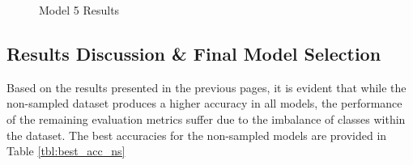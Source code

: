 \documentclass[12pt]{article}
\begin{document}
\begin{figure}[tbp]
\begin{center}
{    \label{fig:ns_m5tfidf}
}

\end{center}
\caption{Model 5 Results}
\label{fig:model5results}
\end{figure}

\newpage

\subsection{Results Discussion \& Final Model Selection}
Based on the results presented in the previous pages, it is evident that while the non-sampled dataset produces a higher accuracy in all models, the performance of the remaining evaluation metrics suffer due to the imbalance of classes within the dataset. The best accuracies for the non-sampled models are provided in Table \ref{tbl:best_acc_ns} 
\end{document}
